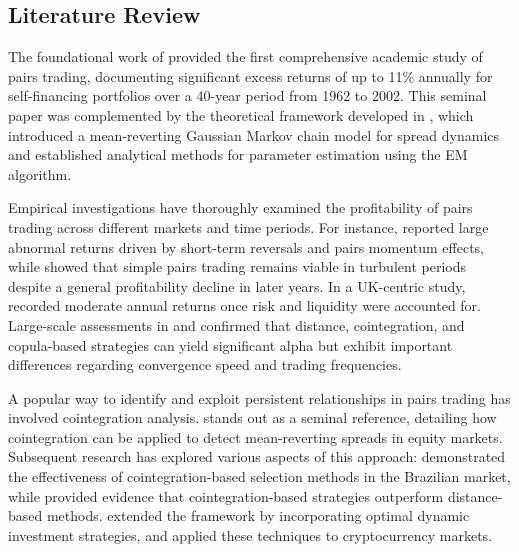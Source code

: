 \subsection{Literature Review} \label{sec:lierature_review}

The foundational work of \cite{Gatev2006} provided the first comprehensive academic study of pairs trading, documenting significant excess returns of up to 11\% annually for self-financing portfolios over a 40-year period from 1962 to 2002. This seminal paper was complemented by the theoretical framework developed in \cite{Elliott2005}, which introduced a mean-reverting Gaussian Markov chain model for spread dynamics and established analytical methods for parameter estimation using the EM algorithm.

Empirical investigations have thoroughly examined the profitability of pairs trading across different markets and time periods. For instance, \cite{Chen2019} reported large abnormal returns driven by short-term reversals and pairs momentum effects, while \cite{Do2010} showed that simple pairs trading remains viable in turbulent periods despite a general profitability decline in later years. In a UK-centric study, \cite{Bowen2014} recorded moderate annual returns once risk and liquidity were accounted for. Large-scale assessments in \cite{Krauss2016} and \cite{Rad2016} confirmed that distance, cointegration, and copula-based strategies can yield significant alpha but exhibit important differences regarding convergence speed and trading frequencies.

A popular way to identify and exploit persistent relationships in pairs trading has involved cointegration analysis. \cite{vidyamurthy2004pairs} stands out as a seminal reference, detailing how cointegration can be applied to detect mean-reverting spreads in equity markets. 
Subsequent research has explored various aspects of this approach: \cite{Caldeira2013} demonstrated the effectiveness of cointegration-based selection methods in the Brazilian market, while \cite{Huck2014} provided evidence that cointegration-based strategies outperform distance-based methods. \cite{Cartea2015} extended the framework by incorporating optimal dynamic investment strategies, and \cite{Lintilhac2016} applied these techniques to cryptocurrency markets.

